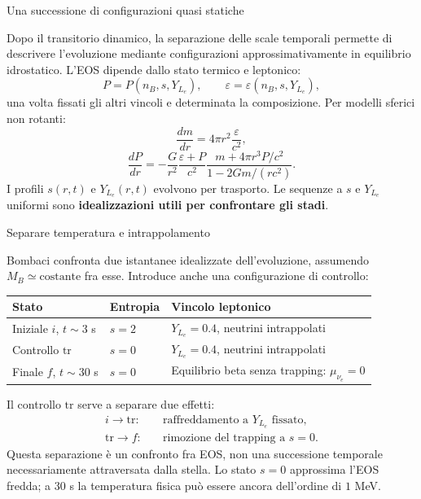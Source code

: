\begin{frame}[t,label=pns-completa-06]{Una successione di configurazioni quasi statiche}
\small\raggedright
Dopo il transitorio dinamico, la separazione delle scale temporali
permette di descrivere l'evoluzione mediante configurazioni
approssimativamente in equilibrio idrostatico.
L'EOS dipende dallo stato termico e leptonico:
\[
 P=P(n_B,s,Y_{L_e}),
 \qquad\varepsilon=\varepsilon(n_B,s,Y_{L_e}),
\]
una volta fissati gli altri vincoli e determinata la composizione.
Per modelli sferici non rotanti:
\[
 \frac{dm}{dr}=4\pi r^2\frac{\varepsilon}{c^2},
\]
\[
 \frac{dP}{dr}
 =-\frac{G}{r^2}\frac{\varepsilon+P}{c^2}
 \frac{m+4\pi r^3P/c^2}{1-2Gm/(rc^2)}.
\]
I profili $s(r,t)$ e $Y_{L_e}(r,t)$ evolvono per trasporto.
Le sequenze a $s$ e $Y_{L_e}$ uniformi sono
\textbf{idealizzazioni utili per confrontare gli stadi}.
\end{frame}

\begin{frame}[t,label=pns-completa-07]{Separare temperatura e intrappolamento}
\small\raggedright
Bombaci confronta due istantanee idealizzate dell'evoluzione,
assumendo $M_B\simeq\mathrm{costante}$ fra esse. Introduce anche
una configurazione di controllo:

\medskip
{\renewcommand{\arraystretch}{1.28}
\begin{tabular}{|p{}|p{}|p{}|}
\hline
\textbf{Stato} & \textbf{Entropia} & \textbf{Vincolo leptonico} \\
\hline
Iniziale $i$, $t\sim3$ s & $s=2$ & $Y_{L_e}=0.4$, neutrini intrappolati \\
\hline
Controllo $\mathrm{tr}$ & $s=0$ & $Y_{L_e}=0.4$, neutrini intrappolati \\
\hline
Finale $f$, $t\sim30$ s & $s=0$ & Equilibrio beta senza trapping: $\mu_{\nu_e}=0$ \\
\hline
\end{tabular}}

\medskip
Il controllo $\mathrm{tr}$ serve a separare due effetti:
\[
 \begin{aligned}
 i\longrightarrow\mathrm{tr}:&\quad\text{raffreddamento a }Y_{L_e}\text{ fissato},\\
 \mathrm{tr}\longrightarrow f:&\quad\text{rimozione del trapping a }s=0.
 \end{aligned}
\]
Questa separazione \`e un confronto fra EOS, non una successione
temporale necessariamente attraversata dalla stella.
Lo stato $s=0$ approssima l'EOS fredda; a $30$ s la temperatura
fisica pu\`o essere ancora dell'ordine di $1$ MeV.

\end{frame}


